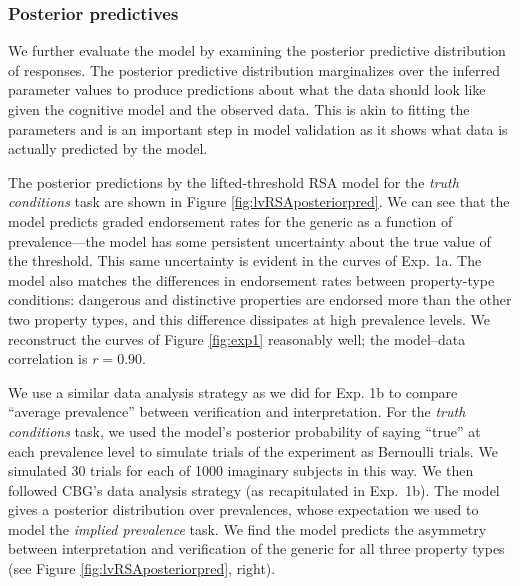 \documentclass[10pt,letterpaper]{article}
\begin{document}
\subsubsection{Posterior predictives}

We further evaluate the model by examining the posterior predictive distribution of responses. The posterior predictive distribution marginalizes over the inferred parameter values to produce predictions about what the data should look like given the cognitive model and the observed data. This is akin to fitting the parameters and is an important step in model validation as it shows what data is actually predicted by the model.

The posterior predictions by the lifted-threshold RSA model for the \emph{truth conditions} task are shown in Figure \ref{fig:lvRSAposteriorpred}. 
We can see that the model predicts graded endorsement rates for the generic as a function of prevalence---the model has some persistent uncertainty about the true value of the threshold. This same uncertainty is evident in the curves of Exp. 1a.
The model also matches the differences in endorsement rates between property-type conditions: dangerous and distinctive properties are endorsed more than the other two property types, and this difference dissipates at high prevalence levels.
We reconstruct the curves of Figure \ref{fig:exp1} reasonably well; the model--data correlation is $r = 0.90$.


We use a similar data analysis strategy as we did for Exp. 1b to compare ``average prevalence'' between verification and interpretation. For the \emph{truth conditions} task, we used the model's posterior probability of saying ``true'' at each prevalence level to simulate trials of the experiment as Bernoulli trials. We simulated 30 trials for each of 1000 imaginary subjects in this way. We then followed CBG's data analysis strategy (as recapitulated in Exp.~1b). The model gives a posterior distribution over prevalences, whose expectation we used to model the \emph{implied prevalence} task. We find the model predicts the asymmetry between interpretation and verification of the generic for all three property types (see Figure \ref{fig:lvRSAposteriorpred}, right).
\end{document}

